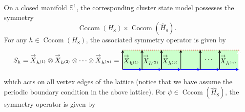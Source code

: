 \documentclass[a4paper,11pt]{article}
\theoremstyle{theorem}
\theoremstyle{remark}
\newcommand{\XR}{\overset{\rightarrow}{X}}
\newcommand{\cone}{(1)}
\newcommand{\ctwo}{(2)}
\newcommand{\cthree}{(3)}
\newcommand{\Cocom}{\operatorname{Cocom}}
\begin{document}
On a closed manifold $\mathbb{S}^1$, the corresponding cluster state model possesses the symmetry
\begin{equation}
    \Cocom(H_8) \times \Cocom(\hat{H}_8).
\end{equation}
For any $h \in \Cocom(H_8)$, the associated symmetry operator is given by
\begin{equation}
    S_h = \XR_{h^{\cone}} \otimes \XR_{h^{\ctwo}} \otimes \cdots \otimes \XR_{h^{(n)}}= 
    \begin{aligned}
\begin{tikzpicture}
    \def\n{5}
    \def\s{1}
    \fill[green!20] (0, 0) rectangle (\n*\s+\s, \s); %
    \foreach \i in {0,...,\n} {
        \draw[-stealth, line width=1.0pt,blue, midway] (\i*\s, 0) -- (\i*\s+\s, 0);
        \draw[dotted, line width=1.0pt,red, midway] (\i*\s, \s) -- (\i*\s+\s, \s);
        \draw[-stealth,line width=1.0pt, midway] (\i*\s, 0) -- (\i*\s, \s);
    }
    \draw[-stealth, midway,line width=1.0pt] (\n*\s+\s, 0) -- (\n*\s+\s, \s);
    \node[ line width=0.2pt, dashed, draw opacity=0.5] (a) at (.45,0.5){$\XR_{h^{\cone}}$};
    \node[ line width=0.2pt, dashed, draw opacity=0.5] (a) at (1.45,0.5){$\XR_{h^{\ctwo}}$};
    \node[ line width=0.2pt, dashed, draw opacity=0.5] (a) at (2.45,0.5){$\XR_{h^{\cthree}}$};
        \node[ line width=0.2pt, dashed, draw opacity=0.5] (a) at (4.45,0.5){$\cdots$};
     \node[ line width=0.2pt, dashed, draw opacity=0.5] (a) at (5.45,0.5){$\XR_{h^{(n)}}$};
      \draw[-stealth, white, line width=2pt, midway] (6, 0) -- (6, 1.02);
\end{tikzpicture}
\end{aligned}
\end{equation}
which acts on all vertex edges of the lattice (notice that we have assume the periodic boundary condition in the above lattice).
For $\psi\in \Cocom(\hat{H}_8)$, the symmetry operator is given by 
\end{document}
